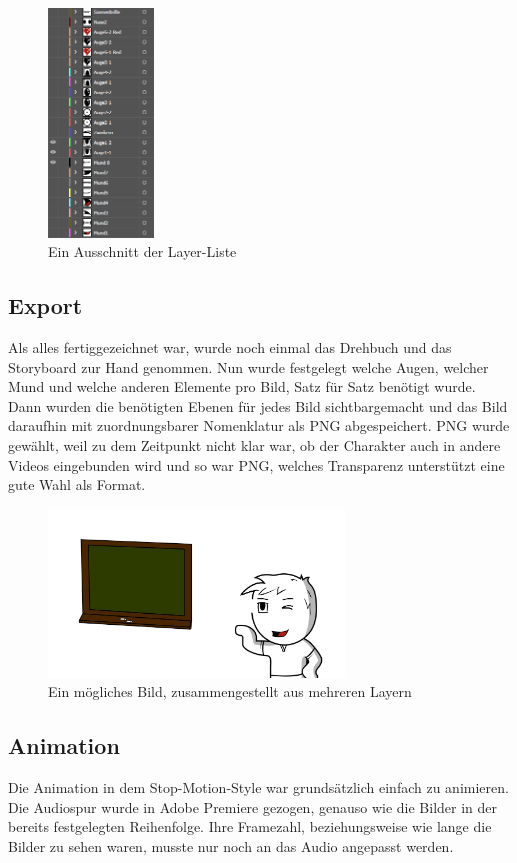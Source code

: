 \begin{figure}[H] 
  \centering
     \includegraphics[width=0.25\textwidth]{video_abb3.png}
  \caption{Ein Ausschnitt der Layer-Liste}
\end{figure}

\subsection{Export}
Als alles fertiggezeichnet war, wurde noch einmal das Drehbuch und das Storyboard zur Hand genommen. Nun wurde festgelegt welche Augen, welcher Mund und welche anderen Elemente pro Bild, Satz für Satz benötigt wurde. Dann wurden die benötigten Ebenen für jedes Bild sichtbargemacht und das Bild daraufhin mit zuordnungsbarer Nomenklatur als PNG abgespeichert. PNG wurde gewählt, weil zu dem Zeitpunkt nicht klar war, ob der Charakter auch in andere Videos eingebunden wird und so war PNG, welches Transparenz unterstützt eine gute Wahl als Format.

\begin{figure}[H] 
  \centering
     \includegraphics[width=0.7\textwidth]{video_abb4.png}
  \caption{Ein mögliches Bild, zusammengestellt aus mehreren Layern}
\end{figure}

\subsection{Animation}
Die Animation in dem Stop-Motion-Style war grundsätzlich einfach zu animieren. Die Audiospur wurde in Adobe Premiere gezogen, genauso wie die Bilder in der bereits festgelegten Reihenfolge. Ihre Framezahl, beziehungsweise wie lange die Bilder zu sehen waren, musste nur noch an das Audio angepasst werden.

